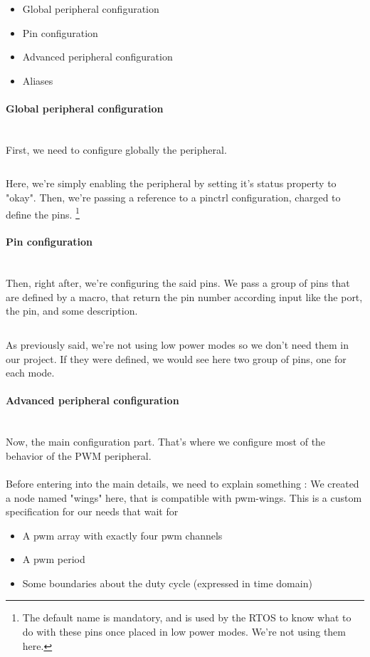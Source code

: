 \begin{itemize}[noitemsep]
    \item Global peripheral configuration
    \item Pin configuration
    \item Advanced peripheral configuration
    \item Aliases
\end{itemize}

\paragraph{Global peripheral configuration} ~\\
First, we need to configure globally the peripheral.
\inputminted[linenos, firstline=17, lastline=21]{devicetree}{\DeviceTree/topaze-pwm-servo.dtsi}

Here, we're simply enabling the peripheral by setting it's status property to
"okay". Then, we're passing a reference to a pinctrl configuration, charged to
define the pins. \footnote{ The default name is mandatory, and is used by the
    RTOS to know what to do with these pins once placed in low power modes. We're
    not using them here. }

\paragraph{Pin configuration} ~\\
Then, right after, we're configuring the said pins. We pass a group of pins that are defined by a
macro, that return the pin number according input like the port, the pin, and some description.

\inputminted[linenos, firstline=24, lastline=33]{devicetree}{\DeviceTree/topaze-pwm-servo.dtsi}

As previously said, we're not using low power modes so we don't need them in
our project. If they were defined, we would see here two group of pins, one for
each mode.

\paragraph{Advanced peripheral configuration} ~\\
Now, the main configuration part. That's where we configure most of the behavior of the PWM peripheral.

\paragraph{}
Before entering into the main details, we need to explain something : We
created a node named "wings" here, that is compatible with pwm-wings. This is a
custom specification for our needs that wait for
\begin{itemize}[noitemsep]
    \item A pwm array with exactly four pwm channels
    \item A pwm period
    \item Some boundaries about the duty cycle (expressed in time domain)
\end{itemize}

